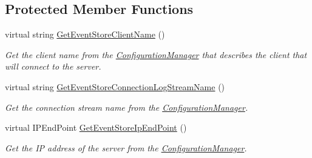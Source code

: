\subsection*{Protected Member Functions}
\begin{DoxyCompactItemize}
\item 
virtual string \hyperlink{classCqrs_1_1EventStore_1_1EventStoreConnectionHelper_af2520736a2fb83c8b4b03e3581980c75_af2520736a2fb83c8b4b03e3581980c75}{Get\+Event\+Store\+Client\+Name} ()
\begin{DoxyCompactList}\small\item\em Get the client name from the \hyperlink{classCqrs_1_1EventStore_1_1EventStoreConnectionHelper_aa518bbaa1cd7d75a57429c3cf4dd4f96_aa518bbaa1cd7d75a57429c3cf4dd4f96}{Configuration\+Manager} that describes the client that will connect to the server. \end{DoxyCompactList}\item 
virtual string \hyperlink{classCqrs_1_1EventStore_1_1EventStoreConnectionHelper_a8c018b324a38ce67ab73e637b1aa7bec_a8c018b324a38ce67ab73e637b1aa7bec}{Get\+Event\+Store\+Connection\+Log\+Stream\+Name} ()
\begin{DoxyCompactList}\small\item\em Get the connection stream name from the \hyperlink{classCqrs_1_1EventStore_1_1EventStoreConnectionHelper_aa518bbaa1cd7d75a57429c3cf4dd4f96_aa518bbaa1cd7d75a57429c3cf4dd4f96}{Configuration\+Manager}. \end{DoxyCompactList}\item 
virtual I\+P\+End\+Point \hyperlink{classCqrs_1_1EventStore_1_1EventStoreConnectionHelper_af0cdad325bbb3b3b45fe427028a322aa_af0cdad325bbb3b3b45fe427028a322aa}{Get\+Event\+Store\+Ip\+End\+Point} ()
\begin{DoxyCompactList}\small\item\em Get the IP address of the server from the \hyperlink{classCqrs_1_1EventStore_1_1EventStoreConnectionHelper_aa518bbaa1cd7d75a57429c3cf4dd4f96_aa518bbaa1cd7d75a57429c3cf4dd4f96}{Configuration\+Manager}. \end{DoxyCompactList}\end{DoxyCompactItemize}
